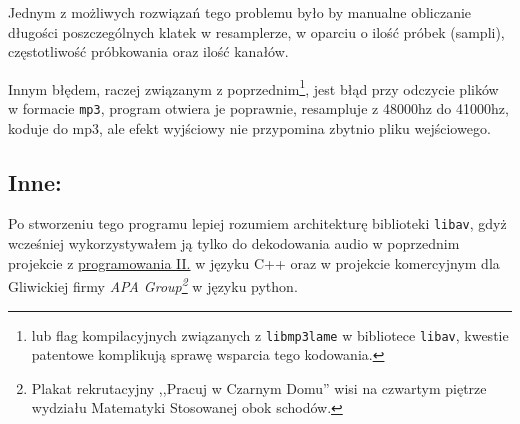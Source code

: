 \documentclass[a4paper,12pt]{article}
\begin{document}
Jednym z możliwych rozwiązań tego problemu było by manualne obliczanie długości
poszczególnych klatek w resamplerze, w oparciu o ilość próbek (sampli),
częstotliwość próbkowania oraz ilość kanałów.

Innym błędem, raczej związanym z poprzednim\footnote{lub flag kompilacyjnych
związanych z \texttt{libmp3lame} w bibliotece \texttt{libav}, kwestie patentowe
komplikują sprawę wsparcia tego kodowania.}, jest błąd przy odczycie plików w
formacie \texttt{mp3}, program otwiera je poprawnie, resampluje z 48000hz do
41000hz, koduje do mp3, ale efekt wyjściowy nie przypomina zbytnio pliku
wejściowego.

\subsection{Inne:}

Po stworzeniu tego programu lepiej rozumiem architekturę biblioteki
\texttt{libav}, gdyż wcześniej wykorzystywałem ją tylko do dekodowania audio w
poprzednim projekcie z
\href{https://github.com/HakierGrzonzo/GrzesSFMLlib}{programowania II.} w języku
C++ oraz w projekcie komercyjnym dla Gliwickiej firmy \emph{APA
Group\footnote{Plakat rekrutacyjny ,,Pracuj w Czarnym Domu'' wisi na czwartym
piętrze wydziału Matematyki Stosowanej obok schodów.}} w języku
python.
\end{document}
